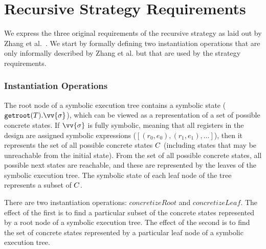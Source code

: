 

\section{Recursive Strategy Requirements}
We express the three original requirements of the recursive strategy as
laid out by Zhang et al.~\cite{zhang2018recursive}. 
We start by formally defining two instantiation operations that are only informally described
by Zhang et al. but that are used by the strategy requirements.

\subsubsection{Instantiation Operations} 

The root node of a symbolic execution tree \tree{} contains a symbolic state
  ($\mathtt{getroot}(\tree).\vv{\symstate}$), which can be viewed as a representation of
  a set of possible concrete states. If $\vv{\symstate}$ is fully symbolic, meaning
  that all registers in the design are assigned symbolic expressions ($[(r_0,e_0),(r_1,e_1),\ldots]$), then it represents the set of all
  possible concrete states $C$ (including states that may be
  unreachable from the initial state). From the set of all possible concrete
  states, all possible next states are reachable, and these are represented by
  the leaves of the symbolic execution tree. The symbolic state of each leaf node of the tree
  represents a subset of $C$.

  There are two instantiation operations: $\mathit{concretizeRoot}$ and
  $\mathit{concretizeLeaf}$. The effect of the first is to find a particular
  subset of the concrete states represented by a root node of a symbolic
  execution tree. The effect of the second is to find the set of concrete states
  represented by a particular leaf node of a symbolic execution tree. 



